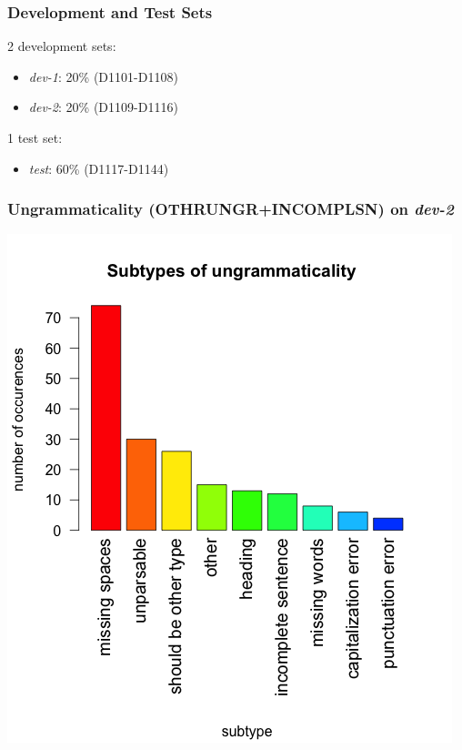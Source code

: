 \documentclass[table]{beamer}
\begin{document}
\begin{frame}
  \frametitle{Development and Test Sets}
  2 development sets:
  \begin{itemize}
    \item \textit{dev-1}: 20\% (D1101-D1108)
    \item \textit{dev-2}: 20\% (D1109-D1116)
  \end{itemize}

  \vspace{1cm}
  1 test set: 
  \begin{itemize}
    \item \textit{test}: 60\% (D1117-D1144)
  \end{itemize}
\end{frame}

\begin{frame}
  \frametitle{Ungrammaticality (OTHRUNGR+INCOMPLSN) on \textit{dev-2}}
  \begin{center}
    \includegraphics[scale=0.4]{subtypes_dev2.png}
  \end{center}
\end{frame}
\end{document}
